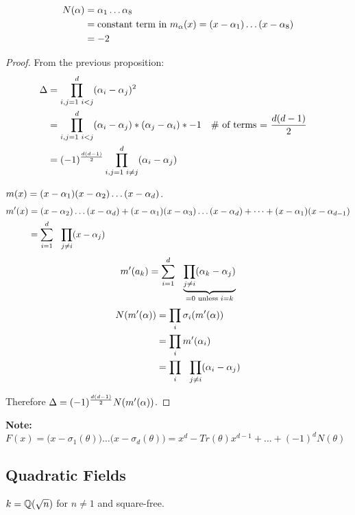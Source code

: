 \documentclass[11pt]{article}
\begin{document}
\begin{align*}
	N(\alpha) &= \alpha_1 \dots \alpha_8\\
	&= \text{constant term in } m_\alpha(x) = (x-\alpha_1) \dots (x-\alpha_8)\\
	&= -2 
\end{align*}

\begin{proof}
	From the previous proposition:
	\begin{align*}
		\Delta &= \prod^d_{i,j=1 \text{ } i<j} (\alpha_i - \alpha_j)^2\\
		&= \prod^d_{i,j=1 \text{ } i<j} (\alpha_i - \alpha_j)*(\alpha_j - \alpha_i)*-1 && \text{\# of terms = } \frac{d(d-1)}{2}\\
 &= (-1)^\frac{d(d-1)}{2}\prod^d_{i,j=1 \text{ } i\neq j} (\alpha_i - \alpha_j)\\
	\end{align*}
	
	$m(x) = (x- \alpha_1) (x-\alpha_2) \dots (x-\alpha_d) $.
	\spa
	\begin{align*}
		m'(x) &= (x-\alpha_2) \dots (x-\alpha_d) + (x-\alpha_1)(x-\alpha_3)\dots (x-\alpha_d) + \dots + (x-\alpha_1) (x-\alpha_{d-1})\\
		&= \sum_{i=1}^d \hspace{7pt}\prod_{j \neq i} (x-\alpha_j)
	\end{align*}
	\begin{align*}
		m'(a_k) = \sum^d_{i=1} \hspace{7pt} \underbrace{\prod_{j\neq i}(\alpha_k - \alpha_j) }_{ = 0 \text{ unless } i=k}
	\end{align*}
	\begin{align*}
		N(m'(\alpha)) &= \prod_i \sigma_i(m'(\alpha))\\
		&= \prod_i m'(\alpha_i)\\
		&= \prod_i \hspace{7pt} \prod_{j \neq i} (\alpha_i - \alpha_j)
	\end{align*}
	\spa

	Therefore $\Delta = (-1)^\frac{d(d-1)}{2} N(m'(\alpha))$.
\end{proof}
\spa
\textbf{Note: } $F(x) = \Big(x-\sigma_1(\theta)\Big)\dots \Big(x-\sigma_d(\theta) \Big) = x^d - Tr(\theta)x^{d-1} + \dots + (-1)^d N(\theta)$

\subsection{Quadratic Fields}
$k = \mathbb{Q}(\sqrt{n}) $ for $n \neq 1$ and square-free.
\end{document}
